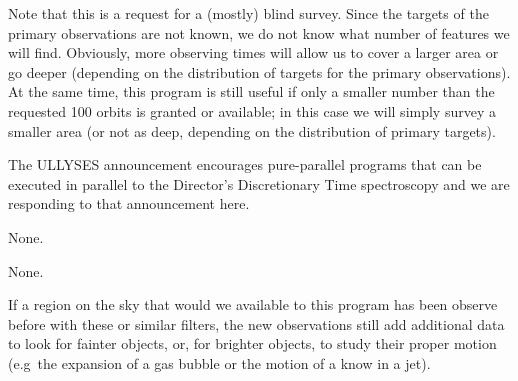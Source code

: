 \documentclass[12pt]{article}
\begin{document}
Note that this is a request for a (mostly) blind survey. Since the targets of the primary observations are not known, we do not know what number of features we will find. Obviously, more observing times will allow us to cover a larger area or go deeper (depending on the distribution of targets for the primary observations). At the same time, this program is still useful if only a smaller number than the requested 100 orbits is granted or available; in this case we will simply survey a smaller area (or not as deep, depending on the distribution of primary targets).

\vspace{1mm}
\noindent The ULLYSES announcement encourages pure-parallel programs that can be executed in parallel to the Director's Discretionary Time spectroscopy and we are responding to that announcement here.



%
%
\specialreq             %
None.


%
%
\coordinatedobs          %
None.


%
%
\duplications           %
If a region on the sky that would we available to this program has been observe before with these or similar filters, the new observations still add additional data to look for fainter objects, or, for brighter objects, to study their proper motion (e.g\ the expansion of a gas bubble or the motion of a know in a jet).


\end{document}

